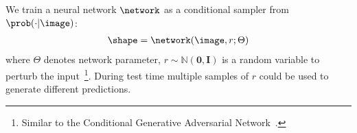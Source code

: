 We train a neural network $\network$ as a conditional sampler from $\prob(\cdot|\image)$: 
\vspace{-3mm}
\begin{align}
\label{eqn:main}
  \shape = \network(\image, r;\Theta)
\end{align}
where $\Theta$ denotes network parameter, $r\sim \mathbb{N}(\mathbf{0}, \mathbf{I})$ is a random variable to perturb the input~\footnote{Similar to the Conditional Generative Adversarial Network~\cite{mirza2014conditional}.}. During test time multiple samples of $r$ could be used to generate different predictions.
  

























